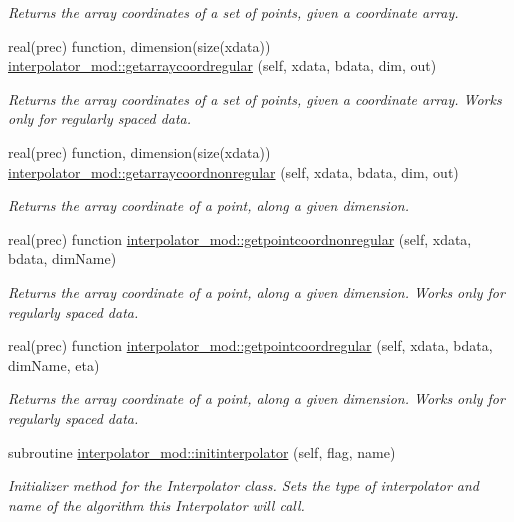 \begin{DoxyCompactItemize}
\begin{DoxyCompactList}\small\item\em Returns the array coordinates of a set of points, given a coordinate array. \end{DoxyCompactList}\item 
real(prec) function, dimension(size(xdata)) \mbox{\hyperlink{namespaceinterpolator__mod_a754f0cf5a885cf5f42a78728bb50c935}{interpolator\+\_\+mod\+::getarraycoordregular}} (self, xdata, bdata, dim, out)
\begin{DoxyCompactList}\small\item\em Returns the array coordinates of a set of points, given a coordinate array. Works only for regularly spaced data. \end{DoxyCompactList}\item 
real(prec) function, dimension(size(xdata)) \mbox{\hyperlink{namespaceinterpolator__mod_a559aea65a39f0e640874f388af7a259d}{interpolator\+\_\+mod\+::getarraycoordnonregular}} (self, xdata, bdata, dim, out)
\begin{DoxyCompactList}\small\item\em Returns the array coordinate of a point, along a given dimension. \end{DoxyCompactList}\item 
real(prec) function \mbox{\hyperlink{namespaceinterpolator__mod_a42030e713960b5bf88d00a76a7ed0a72}{interpolator\+\_\+mod\+::getpointcoordnonregular}} (self, xdata, bdata, dim\+Name)
\begin{DoxyCompactList}\small\item\em Returns the array coordinate of a point, along a given dimension. Works only for regularly spaced data. \end{DoxyCompactList}\item 
real(prec) function \mbox{\hyperlink{namespaceinterpolator__mod_ab47cccb1adf61dcfca1b1ca5a5d213cd}{interpolator\+\_\+mod\+::getpointcoordregular}} (self, xdata, bdata, dim\+Name, eta)
\begin{DoxyCompactList}\small\item\em Returns the array coordinate of a point, along a given dimension. Works only for regularly spaced data. \end{DoxyCompactList}\item 
subroutine \mbox{\hyperlink{namespaceinterpolator__mod_adcaf3bba800f19991ed4f33c968184e9}{interpolator\+\_\+mod\+::initinterpolator}} (self, flag, name)
\begin{DoxyCompactList}\small\item\em Initializer method for the Interpolator class. Sets the type of interpolator and name of the algorithm this Interpolator will call. \end{DoxyCompactList}\item 

\end{DoxyCompactItemize}
